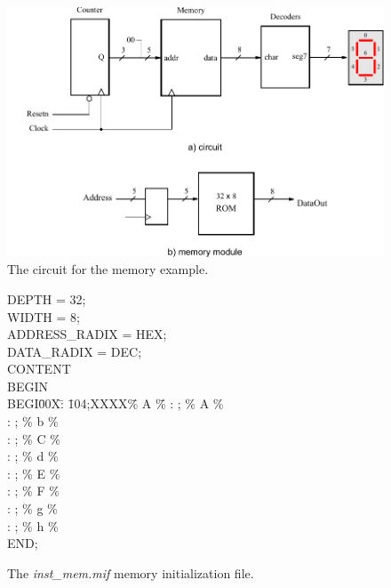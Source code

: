 \documentclass[11pt, twoside, pdftex]{article}
\begin{document}
\begin{figure}[t]
	\begin{center}
		\includegraphics[scale = 1.0]{figures/figdisplay.pdf}
	\end{center}
		  \caption{The circuit for the memory example.}
	\label{fig:memory}
\end{figure}

\begin{figure}[bh!]
\begin{center}
\begin{minipage}[t]{12.5 cm}
\begin{tabbing}
DEPTH = 32;\\
WIDTH = 8;\\
ADDRESS\_RADIX = HEX;\\
DATA\_RADIX = DEC;\\
CONTENT\\
BEGIN\\
BEGI\=00X\=: \=104;XXXX\=\% A \=\% \kill
{} \>: ;    \>\% A \>\%\\
 \>: ;    \>\% b \>\%\\
 \>: ;    \>\% C \>\%\\
 \>: ;   \>\% d \>\%\\
 \>: ;    \>\% E \>\%\\
 \>: ;    \>\% F \>\%\\
 \>: ;   \>\% g \>\%\\
 \>: ;   \>\% h \>\%\\
END;
\end{tabbing}
\end{minipage}
\end{center}
    \caption{The {\it inst\_mem.mif} memory initialization file.}
\label{fig:mif}
\end{figure}
\end{document}
